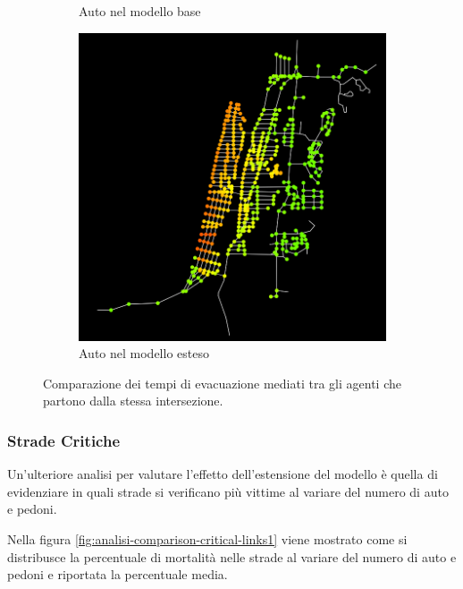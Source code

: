 \begin{figure}[ht]
\begin{subfigure}{0.45\textwidth}
        \caption{Auto nel modello base}
        \label{fig:2d-evtimes-base-car}
    \end{subfigure}
    \hfill
    \begin{subfigure}{0.45\textwidth}
        \centering
        \includegraphics[width=\textwidth]{images/analisi/comparison-ev-times-map-new-car.png}
        \caption{Auto nel modello esteso}
        \label{fig:2d-evtimes-new-car}
    \end{subfigure}
    \caption{Comparazione dei tempi di evacuazione mediati tra gli agenti che partono dalla stessa intersezione. }
    \label{fig:analisi-comparison-ev-times-map}
\end{figure}

\pagebreak

\subsubsection*{Strade Critiche}

Un'ulteriore analisi per valutare l'effetto dell'estensione del modello è quella di evidenziare in quali strade si verificano 
più vittime al variare del numero di auto e pedoni. 

Nella figura \ref{fig:analisi-comparison-critical-links1} viene mostrato come si distribusce la percentuale di mortalità nelle strade 
al variare del numero di auto e pedoni e riportata la percentuale media. 


